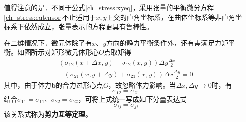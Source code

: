 值得注意的是，不同于公式\eqref{ch_stress:xyeq}，采用张量的平衡微分方程\eqref{ch_stress:eqtensor}不止适用于$x,y$正交的直角坐标系，在曲体坐标系等非直角坐标系下依然成立，张量表示的方程更具有鲁棒性。\par
在二维情况下，微元体除了有$x$、$y$方向的静力平衡条件外，还有需满足力矩平衡。如图所示对矩形微元体形心$O$点取矩得
\begin{multline}
    (\sigma_{12}(x+\Delta x,y) + \sigma_{12}(x,y))\Delta y \frac{\Delta x}{2} \\
  - (\sigma_{21}(x,y+\Delta y) + \sigma_{21}(x,y))\Delta x \frac{\Delta y}{2} = 0
\end{multline}
其中，由于体力$\boldsymbol b$的合力过形心点$O$，故忽略体力影响。当$\Delta x, \Delta y \rightarrow 0$时，有
\begin{equation}
\sigma_{12} = \sigma_{21}
\end{equation}
结合$\sigma_{11}=\sigma_{11}$、$\sigma_{22} = \sigma_{22}$，可将上式统一写成如下分量表达式
\begin{equation}\label{ch_stress:sheareq}
\sigma_{ij} = \sigma_{ji}
\end{equation}
该关系式称为\textbf{剪力互等定理}。

